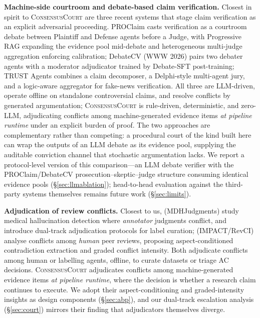 \documentclass[11pt]{article}
\newcommand{\court}{\textsc{ConsensusCourt}}
\begin{document}
\textbf{Machine-side courtroom and debate-based claim verification.}
Closest in spirit to \court{} are three recent systems that stage claim
verification as an explicit adversarial proceeding. PROClaim
\citep{chowdhury2026proclaim} casts verification as a courtroom debate
between Plaintiff and Defense agents before a Judge, with Progressive RAG
expanding the evidence pool mid-debate and heterogeneous multi-judge
aggregation enforcing calibration; DebateCV \citep{he2026debatecv} (WWW
2026) pairs two debater agents with a moderator adjudicator trained by
Debate-SFT post-training; TRUST Agents \citep{venkata2026trustagents}
combines a claim decomposer, a Delphi-style multi-agent jury, and a
logic-aware aggregator for fake-news verification. All three are
LLM-driven, operate offline on standalone controversial claims, and
resolve conflicts by generated argumentation; \court{} is rule-driven,
deterministic, and zero-LLM, adjudicating conflicts among
machine-generated evidence items \emph{at pipeline runtime} under an
explicit burden of proof. The two approaches are complementary rather
than competing: a procedural court of the kind built here can wrap the
outputs of an LLM debate as its evidence pool, supplying the auditable
conviction channel that stochastic argumentation lacks. We report a
protocol-level version of this comparison—an LLM debate verifier with the
PROClaim/DebateCV prosecution--skeptic--judge structure consuming identical
evidence pools (\S\ref{sec:llmablation}); head-to-head evaluation against
the third-party systems themselves remains future work
(\S\ref{sec:limits}).

\textbf{Adjudication of review conflicts.}
Closest to us, \citet{cecil2026beyond} (MDHJudgments) study medical
hallucination detection where \emph{annotator} judgments conflict, and
introduce dual-track adjudication protocols for label curation;
\citet{kumar2026when} (IMPACT/RevCI) analyse conflicts among \emph{human}
peer reviews, proposing aspect-conditioned contradiction extraction and
graded conflict intensity. Both adjudicate conflicts among human or
labelling agents, offline, to curate datasets or triage AC decisions.
\court{} adjudicates conflicts among machine-generated evidence items
\emph{at pipeline runtime}, where the decision is whether a research claim
continues to execute. We adopt their aspect-conditioning and graded-intensity
insights as design components (\S\ref{sec:abp}), and our dual-track
escalation analysis (\S\ref{sec:court}) mirrors their finding that
adjudicators themselves diverge.
\end{document}
